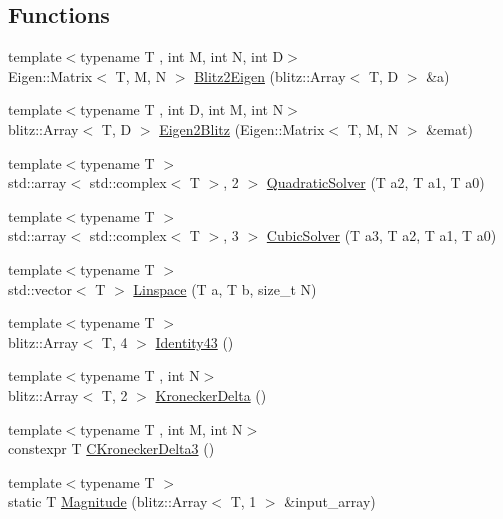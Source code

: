 \subsection*{Functions}
\begin{DoxyCompactItemize}
\item 
{\footnotesize template$<$typename T , int M, int N, int D$>$ }\\Eigen\+::\+Matrix$<$ T, M, N $>$ \mbox{\hyperlink{namespacempc_1_1utilities_afb1a22ab436781cf5a791680bc60988f}{Blitz2\+Eigen}} (blitz\+::\+Array$<$ T, D $>$ \&a)
\item 
{\footnotesize template$<$typename T , int D, int M, int N$>$ }\\blitz\+::\+Array$<$ T, D $>$ \mbox{\hyperlink{namespacempc_1_1utilities_a08e3db41de91c76d936475136d35da9e}{Eigen2\+Blitz}} (Eigen\+::\+Matrix$<$ T, M, N $>$ \&emat)
\item 
{\footnotesize template$<$typename T $>$ }\\std\+::array$<$ std\+::complex$<$ T $>$, 2 $>$ \mbox{\hyperlink{namespacempc_1_1utilities_ad175f8823052a6c863ffb2e90e2b08ca}{Quadratic\+Solver}} (T a2, T a1, T a0)
\item 
{\footnotesize template$<$typename T $>$ }\\std\+::array$<$ std\+::complex$<$ T $>$, 3 $>$ \mbox{\hyperlink{namespacempc_1_1utilities_adbffd8dee20ff121f91cf6be9e19a1b3}{Cubic\+Solver}} (T a3, T a2, T a1, T a0)
\item 
{\footnotesize template$<$typename T $>$ }\\std\+::vector$<$ T $>$ \mbox{\hyperlink{namespacempc_1_1utilities_abb6b125ee38967fe00a7f47bf087b75a}{Linspace}} (T a, T b, size\+\_\+t N)
\item 
{\footnotesize template$<$typename T $>$ }\\blitz\+::\+Array$<$ T, 4 $>$ \mbox{\hyperlink{namespacempc_1_1utilities_a2a7788e9666343e76796346aa521fb4a}{Identity43}} ()
\item 
{\footnotesize template$<$typename T , int N$>$ }\\blitz\+::\+Array$<$ T, 2 $>$ \mbox{\hyperlink{namespacempc_1_1utilities_aee39ac77e4aad3a854879829eed39b37}{Kronecker\+Delta}} ()
\item 
{\footnotesize template$<$typename T , int M, int N$>$ }\\constexpr T \mbox{\hyperlink{namespacempc_1_1utilities_a15cbef577663b27df8b958056104d5d9}{C\+Kronecker\+Delta3}} ()
\item 
{\footnotesize template$<$typename T $>$ }\\static T \mbox{\hyperlink{namespacempc_1_1utilities_a387fd6b2510b25009905e8121755c207}{Magnitude}} (blitz\+::\+Array$<$ T, 1 $>$ \&input\+\_\+array)

\end{DoxyCompactItemize}
